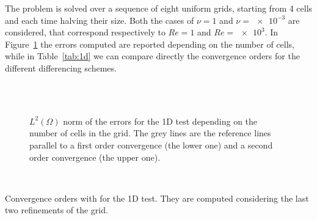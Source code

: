 The problem is solved over a sequence of eight uniform grids, starting from 
4 cells and each time halving their size. Both the cases of $\nu=1$ 
and $\nu=\num{e-3}$ are considered, that correspond respectively to $Re=1$ and $Re=\num{e3}$. In Figure~\ref{fig:1d_err} the errors computed are reported 
depending on the number of cells, while in 
Table~\ref{tab:1d} we can compare directly the 
convergence orders for the different differencing schemes.
\begin{figure}
	\centering
	\subfloat[Upwind, $Re = 1$]{
		}
	\subfloat[Upwind, $Re = \num{e3}$]{
		}\\
	\subfloat[Min-Mod, $Re = 1$]{
		}
	\subfloat[Min-Mod, $Re = \num{e3}$]{
		}\\
	\subfloat[Van Leer, $Re = 1$]{
		}
	\subfloat[Van Leer, $Re = \num{e3}$]{
		}
	\caption[$L^2(\Omega)$ norm of the errors for the 1D test]{$L^2(\Omega)$ 
	norm of the errors for the 1D test 
	depending on the number of cells in the grid. The grey lines are the reference lines parallel to a first order convergence (the lower one) and a second order convergence (the upper one).}
	\label{fig:1d_err}
\end{figure}
\begin{table}
	\centering
	\\
	\caption[Convergence orders for the 1D 
	test]{Convergence orders with for the 1D test. They 
	are computed considering the last two refinements of the grid.}
	\label{tab:1d}
\end{table}

